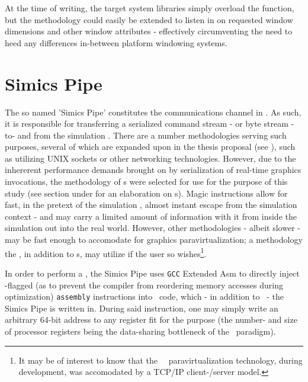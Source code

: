 At the time of writing, the target system libraries simply overload the  function, but the methodology could easily be extended to listen in on requested window dimensions and other window attributes - effectively circumventing the need to heed any differences in-between platform windowing systems.

\section{Simics Pipe}
\label{sec:methodologysolution_simicspipe}
The so named 'Simics Pipe' constitutes the communications channel in \dvttermsimics .
As such, it is responsible for transferring a serialized command stream - or byte stream - to- and from the simulation \dvttermhost .
There are a number methodologies serving such purposes, several of which are expanded upon in the thesis proposal (see ), such as utilizing UNIX sockets or other networking technologies.
However, due to the inhererent performance demands brought on by serialization of real-time graphics invocations, the methodology of \dvttermmagicinstruction s were selected for use for the purpose of this study (see section  under  for an elaboration on \dvttermmagicinstruction s).
Magic instructions allow for fast, in the pretext of the simulation \dvttermtarget , almost instant escape from the simulation context - and may carry a limited amount of information with it from inside the simulation out into the real world.
However, other methodologies - albeit slower - may be fast enough to accomodate for graphics paravirtualization; a methodology the \dvttermandroidemulator , in addition to \dvttermmagicinstruction s, may utilize if the user so wishes\footnote{It may be of interest to know that the \dvttermsimics\ \dvttermopengles\ paravirtualization technology, during development, was accomodated by a TCP/IP client-/server model.}.

In order to perform a \dvttermmagicinstruction , the Simics Pipe uses \texttt{GCC} Extended Asm to directly inject -flagged (as to prevent the compiler from reordering memory accesses during optimization) \texttt{assembly} instructions into \dvttermc\ code, which - in addition to \dvttermcplusplus\ - the Simics Pipe is written in.
During said instruction, one may simply write an arbitrary 64-bit address to any register fit for the purpose (the number- and size of processor registers being the data-sharing bottleneck of the \dvttermmagicinstruction\ paradigm).

